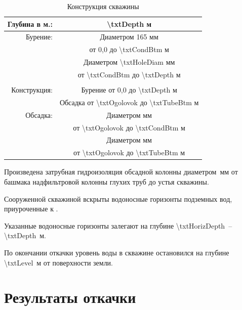 \begin{table}[!h]
	\caption{Конструкция скважины}
	\centering
\begin{tabular}{rc}
	\hline 
	Глубина в м.: & {\num{\txtDepth}} м \\ 
	\hline 
	Бурение: & Диаметром 165 мм \\ 
	& от 0,0 до {\num{\txtCondBtm}} м \\ 
	& Диаметром {\num{\txtHoleDiam}} мм \\ 
	& от {\num{\txtCondBtm}} до {\num{\txtDepth}} м \\ 
	&  \\ 
	\hline 
	Конструкция: & Бурение от 0,0 до {\num{\txtDepth}} м \\ 
	& Обсадка от {\num{\txtOgolovok}} до {\num{\txtTubeBtm}} м \\ 
	\hline 
	Обсадка: & Диаметром {\txtCondDiam} мм \\ 
	& от {\num{\txtOgolovok}} до {\num{\txtCondBtm}} м \\ 
	& Диаметром {\txtTubeDiam} мм  \\ 
	& от {\num{\txtOgolovok}} до {\num{\txtTubeBtm}} м \\ 
	\hline 
\end{tabular} 
\end{table}

Произведена затрубная гидроизоляция обсадной колонны диаметром \txtTubeDiam \,мм от башмака надфильтровой колонны глухих труб до устья скважины.

Сооруженной скважиной вскрыты водоносные горизонты  подземных вод, приуроченные к \emph{\txtGeology}.

Указанные водоносные горизонты залегают на глубине   \num{\txtHorizDepth} \,– \num{\txtDepth} \,м.

По окончании откачки уровень воды в скважине остановился на глубине  \num{\txtLevel} \,м от поверхности земли.

\section{Результаты откачки}

